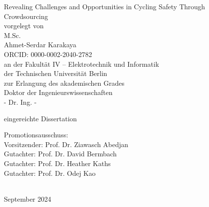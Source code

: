 
\thispagestyle{empty}
\begin{center}
    \huge{Revealing Challenges and Opportunities in Cycling Safety Through Crowdsourcing}\\[2pc]
    
    \large{vorgelegt von}\\
    \large{M.Sc.}\\
    \large{Ahmet-Serdar Karakaya}\\
    \large{ORCID: 0000-0002-2040-2782}\\[2pc]


    an der Fakultät IV – Elektrotechnik und Informatik\\
    der Technischen Universität Berlin\\
    zur Erlangung des akademischen Grades\\
    Doktor der Ingenieurswissenschaften\\
    - Dr. Ing. -
\end{center}

\begin{center}
eingereichte Dissertation
\end{center}

Promotionsausschuss:\\
Vorsitzender: Prof. Dr. Ziawasch Abedjan\\
Gutachter: Prof. Dr. David Bermbach\\
Gutachter: Prof. Dr. Heather Kaths\\
Gutachter: Prof. Dr. Odej Kao\\
\\
\begin{center}
September 2024
\end{center}

\afterpage{\null\thispagestyle{empty}\newpage}

